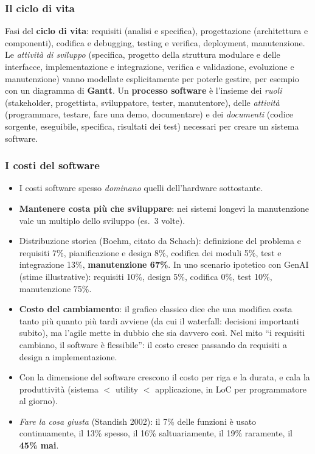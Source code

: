 \documentclass[a4paper,12pt]{article}
\begin{document}
\subsubsection{Il ciclo di vita}
Fasi del \textbf{ciclo di vita}: requisiti (analisi e specifica), progettazione
(architettura e componenti), codifica e debugging, testing e verifica, deployment,
manutenzione. Le \emph{attività di sviluppo} (specifica, progetto della struttura
modulare e delle interfacce, implementazione e integrazione, verifica e validazione,
evoluzione e manutenzione) vanno modellate esplicitamente per poterle gestire, per
esempio con un diagramma di \textbf{Gantt}. Un \textbf{processo software} è l'insieme dei
\emph{ruoli} (stakeholder, progettista, sviluppatore, tester, manutentore), delle
\emph{attività} (programmare, testare, fare una demo, documentare) e dei \emph{documenti}
(codice sorgente, eseguibile, specifica, risultati dei test) necessari per creare un
sistema software.

\subsubsection{I costi del software}
\begin{itemize}
  \item I costi software spesso \emph{dominano} quelli dell'hardware sottostante.
  \item \textbf{Mantenere costa più che sviluppare}: nei sistemi longevi la manutenzione
        vale un multiplo dello sviluppo (es.\ 3 volte).
  \item Distribuzione storica (Boehm, citato da Schach): definizione del problema e
        requisiti 7\%, pianificazione e design 8\%, codifica dei moduli 5\%, test e
        integrazione 13\%, \textbf{manutenzione 67\%}. In uno scenario ipotetico con GenAI
        (stime illustrative): requisiti 10\%, design 5\%, codifica 0\%, test 10\%,
        manutenzione 75\%.
  \item \textbf{Costo del cambiamento}: il grafico classico dice che una modifica costa
        tanto più quanto più tardi avviene (da cui il waterfall: decisioni importanti
        subito), ma l'agile mette in dubbio che sia davvero così. Nel mito ``i requisiti
        cambiano, il software è flessibile'': il costo cresce passando da requisiti a
        design a implementazione.
  \item Con la dimensione del software crescono il costo per riga e la durata, e cala la
        produttività (sistema $<$ utility $<$ applicazione, in LoC per programmatore al
        giorno).
  \item \emph{Fare la cosa giusta} (Standish 2002): il 7\% delle funzioni è usato
        continuamente, il 13\% spesso, il 16\% saltuariamente, il 19\% raramente, il
        \textbf{45\% mai}.
\end{itemize}
\end{document}
